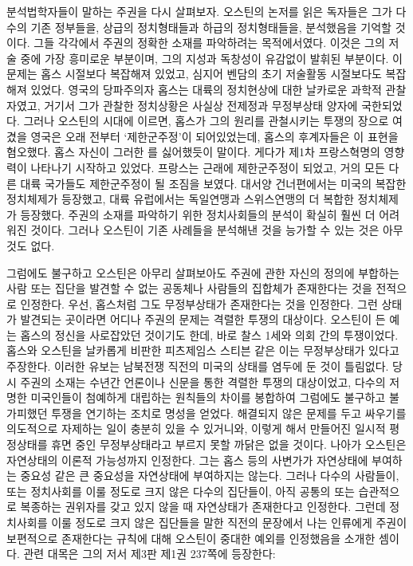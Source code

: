 분석법학자들이 말하는 주권을 다시 살펴보자.
오스틴의 논저를 읽은 독자들은
그가 다수의 기존 정부들을,
 상급의 정치형태들과 하급의 정치형태들을,
분석했음을 기억할 것이다.
그들 각각에서 주권의 정확한 소재를 파악하려는 목적에서였다.
이것은 그의 저술 중에 가장 흥미로운 부분이며,
그의 지성과 독창성이 유감없이 발휘된 부분이다.
이 문제는 홉스 시절보다 복잡해져 있었고, 심지어
벤담의 초기 저술활동 시절보다도 복잡해져 있었다.
영국의 당파주의자 홉스는 대륙의 정치현상에 대한 날카로운 과학적 관찰자였고,
거기서 그가 관찰한 정치상황은 
사실상 전제정과 무정부상태 양자에 국한되었다.
그러나 오스틴의 시대에 이르면,
홉스가 그의 원리를 관철시키는 투쟁의 장으로 여겼을 영국은
오래 전부터 `제한군주정'이 되어있었는데,
홉스의 후계자들은
이 표현을 혐오했다.
홉스 자신이 그러한 를 싫어했듯이 말이다.
게다가 제1차 프랑스혁명의 영향력이 나타나기 시작하고 있었다.
프랑스는 근래에 제한군주정이 되었고,
거의 모든 다른 대륙 국가들도 제한군주정이 될 조짐을 보였다.
대서양 건너편에서는 미국의 복잡한 정치체제가 등장했고,
대륙 유럽에서는 독일연맹과 스위스연맹의 더 복합한 정치체제가 등장했다.
주권의 소재를 파악하기 위한 정치사회들의 분석이
확실히 훨씬 더 어려워진 것이다.
그러나
오스틴이 기존 사례들을 분석해낸 것을 능가할 수 있는 것은 아무 것도 없다.

그럼에도 불구하고 오스틴은
아무리 살펴보아도 주권에 관한 자신의 정의에 부합하는 사람 또는 집단을
발견할 수 없는 공동체나 사람들의 집합체가 존재한다는 것을 전적으로 인정한다.
우선, 홉스처럼 그도 무정부상태가 존재한다는 것을 인정한다.
그런 상태가 발견되는 곳이라면 어디나
주권의 문제는 격렬한 투쟁의 대상이다.
오스틴이 든 예는 홉스의 정신을 사로잡았던 것이기도 한데,
바로 찰스 1세와 의회 간의 투쟁이었다.
홉스와 오스틴을 날카롭게 비판한 피츠제임스 스티븐
같은 이는  무정부상태가 있다고 주장한다.
이러한 유보는 남북전쟁 직전의 미국의 상태를 염두에 둔 것이 틀림없다.
당시 주권의 소재는 수년간 언론이나 신문을 통한 격렬한 투쟁의 대상이었고,
다수의 저명한 미국인들이 첨예하게 대립하는 원칙들의 차이를 봉합하여
그럼에도 불구하고 불가피했던 투쟁을 연기하는 조치로 명성을 얻었다.
해결되지 않은 문제를 두고 싸우기를 의도적으로 자제하는 일이 충분히 있을 수
있거니와, 이렇게 해서 만들어진 일시적 평정상태를 휴면 중인 무정부상태라고
부르지 못할 까닭은 없을 것이다.
나아가 오스틴은 자연상태의 이론적 가능성까지 인정한다.
그는 홉스 등의 사변가가 자연상태에 부여하는 중요성 같은
큰 중요성을 자연상태에 부여하지는 않는다.
그러나 다수의 사람들이, 또는
정치사회를 이룰 정도로 크지 않은 다수의 집단들이,
아직 공통의 또는 습관적으로 복종하는 권위자를 갖고 있지 않을 때
자연상태가 존재한다고 인정한다.
그런데
정치사회를 이룰 정도로 크지 않은 집단들을 말한 직전의 문장에서
나는 인류에게 주권이 보편적으로 존재한다는 규칙에 대해 오스틴이 중대한 예외를
인정했음을 소개한 셈이다.
관련 대목은 그의 저서 제3판 제1권 237쪽에 등장한다:

